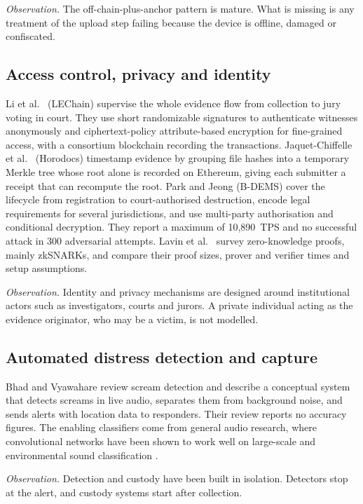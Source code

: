 \documentclass[conference,a4paper,10pt]{IEEEtran}
\begin{document}
\emph{Observation.} The off-chain-plus-anchor pattern is mature. What is missing is any treatment of the upload step failing because the device is offline, damaged or confiscated.

\subsection{Access control, privacy and identity}
Li et al.\ \cite{mli} (LEChain) supervise the whole evidence flow from collection to jury voting in court. They use short randomizable signatures to authenticate witnesses anonymously and ciphertext-policy attribute-based encryption for fine-grained access, with a consortium blockchain recording the transactions. Jaquet-Chiffelle et al.\ \cite{jaquet} (Horodocs) timestamp evidence by grouping file hashes into a temporary Merkle tree whose root alone is recorded on Ethereum, giving each submitter a receipt that can recompute the root. Park and Jeong \cite{park} (B-DEMS) cover the lifecycle from registration to court-authorised destruction, encode legal requirements for several jurisdictions, and use multi-party authorisation and conditional decryption. They report a maximum of 10,890~TPS and no successful attack in 300 adversarial attempts. Lavin et al.\ \cite{lavin} survey zero-knowledge proofs, mainly zkSNARKs, and compare their proof sizes, prover and verifier times and setup assumptions.

\emph{Observation.} Identity and privacy mechanisms are designed around institutional actors such as investigators, courts and jurors. A private individual acting as the evidence originator, who may be a victim, is not modelled.

\subsection{Automated distress detection and capture}
Bhad and Vyawahare \cite{bhad} review scream detection and describe a conceptual system that detects screams in live audio, separates them from background noise, and sends alerts with location data to responders. Their review reports no accuracy figures. The enabling classifiers come from general audio research, where convolutional networks have been shown to work well on large-scale and environmental sound classification \cite{hershey,salamon}.

\emph{Observation.} Detection and custody have been built in isolation. Detectors stop at the alert, and custody systems start after collection.
\end{document}
